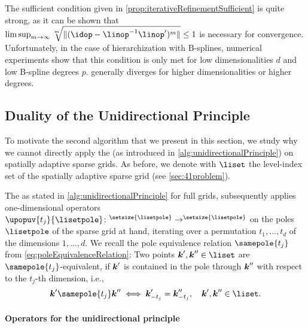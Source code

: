 The sufficient condition given in \cref{prop:iterativeRefinementSufficient}
is quite strong, as it can be shown that $\limsup_{m \to \infty}
\sqrt[m]{\norm{(\idop - \linop^{-1} \linop')^m}} \le 1$ is necessary for
convergence.
Unfortunately, in the case of hierarchization with B-splines,
numerical experiments show that
this condition is only met for low dimensionalities $d$ and low
B-spline degrees $p$.
 generally diverges
for higher dimensionalities or higher degrees.



\subsection{Duality of the Unidirectional Principle}
\label{sec:452duality}

To motivate the second algorithm that we present in this section,
we study why we cannot directly apply the \up
(as introduced in \cref{alg:unidirectionalPrinciple})
on spatially adaptive sparse grids.
As before, we denote with $\liset$ the level-index set of
the spatially adaptive sparse grid (see \cref{sec:41problem}).

The \up\punctfix{,} as stated in
\cref{alg:unidirectionalPrinciple} for full grids,
subsequently applies one-dimensional operators
$\upopuv{t_j}{\lisetpole}\colon \real^{\setsize{\lisetpole}} \to
\real^{\setsize{\lisetpole}}$
on the poles $\lisetpole$ of the sparse grid at hand,
iterating over a permutation $t_1, \dotsc, t_d$
of the dimensions $1, \dotsc, d$.
We recall the pole equivalence relation $\samepole{t_j}$
from \cref{eq:poleEquivalenceRelation}:
Two points $\*k', \*k'' \in \liset$ are $\samepole{t_j}$-equivalent,
if ${\boldsymbol{k}}'$ is contained in the pole through ${\boldsymbol{k}}''$
with respect to the $t_j$-th dimension, i.e.,
\begin{equation}
  \*k' \samepole{t_j} \*k'' \iff \*k'_{-t_j} = \*k''_{-t_j},\quad
  \*k', \*k'' \in \liset.
\end{equation}

\paragraph{Operators for the unidirectional principle}

